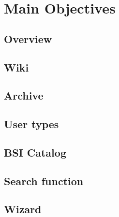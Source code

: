 \chapter{Main Objectives}
\section{Overview}

\section{Wiki}


\section{Archive}

\section{User types}


\section{BSI Catalog}


\section{Search function}
\label{search_function}

\section{Wizard}
\label{wizard}

